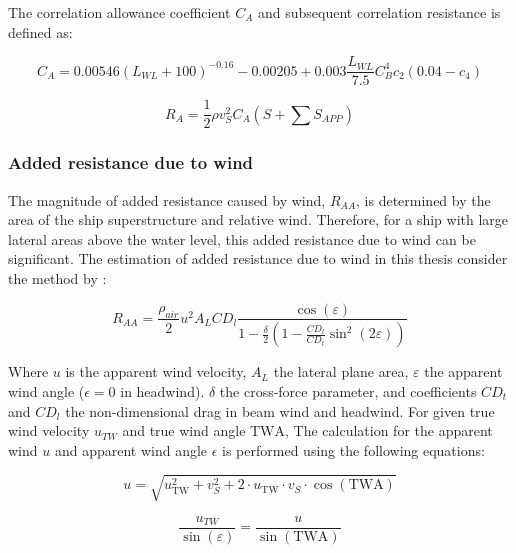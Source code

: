 The correlation allowance coefficient $C_A$ and subsequent correlation resistance is defined as:

\begin{equation}
    \label{eqn:Ca_correlation}
    C_A = 0.00546(L_{WL}+100)^{-0.16} - 0.00205 + 0.003\frac{L_{WL}}{7.5}C_{B}^4c_2(0.04-c_4)
\end{equation}

\begin{equation}
    \label{eqn:R_a}
    R_A = \frac{1}{2}\rho v_S^2 C_A (S+\sum S_{APP})
\end{equation}

\subsubsection{Added resistance due to wind}\label{sec:wind_resistance}

The magnitude of added resistance caused by wind, $R_{AA}$, is determined by the area of the ship superstructure and relative wind. Therefore, for a ship with large lateral areas above the water level, this added resistance due to wind can be significant. The estimation of added resistance due to wind in this thesis consider the method by :

\begin{equation}
    \label{eqn:Raa_blendermann}
    R_{AA} = \frac{\rho_{air}}{2}u^2A_{L}CD_l \frac{\cos{(\varepsilon)}}{1-\frac{\delta}{2}(1-\frac{CD_l}{CD_t}\sin^2{(2\varepsilon)})}
\end{equation}

Where $u$ is the apparent wind velocity, $A_L$ the lateral plane area, $\varepsilon$ the apparent wind angle ($\epsilon = 0$ in headwind). $\delta$ the cross-force parameter, and coefficients $CD_t$ and $CD_l$ the non-dimensional drag in beam wind and headwind. For given true wind velocity $u_{TW}$ and true wind angle $\text{TWA}$, The calculation for the apparent wind $u$ and apparent wind angle $\epsilon$ is performed using the following equations:

\begin{equation}
    \label{eqn:u_AW}
    u = \sqrt{u_{\text{TW}}^2 + v_S^2 + 2 \cdot u_{\text{TW}} \cdot v_S \cdot \cos(\text{TWA})}
\end{equation}

\begin{equation}
    \label{eqn:epsilon_AWA}
    \frac{u_{TW}}{\sin(\varepsilon)} = \frac{u}{\sin({\text{TWA}})}
\end{equation}

